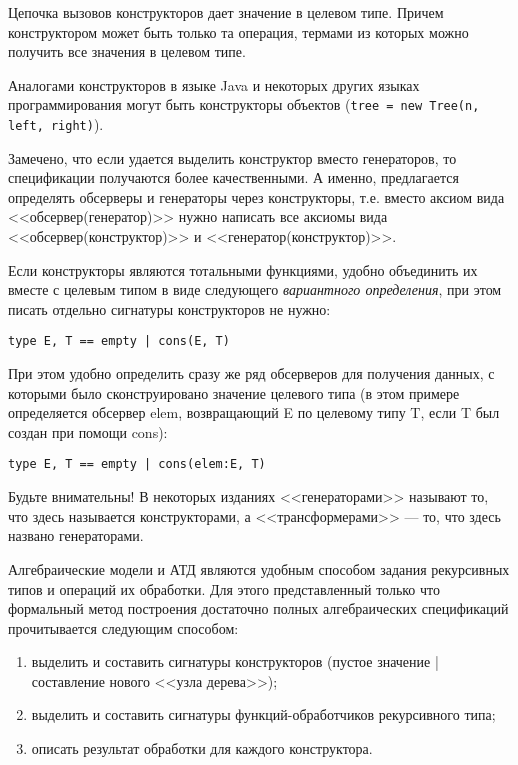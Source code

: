 Цепочка вызовов конструкторов дает значение в целевом типе. Причем конструктором может быть только та операция, термами из которых можно получить все значения в целевом типе.

Аналогами конструкторов в языке Java и некоторых других языках программирования могут быть конструкторы объектов (\texttt{tree = new Tree(n, left, right)}).

Замечено, что если удается выделить конструктор вместо генераторов, то спецификации получаются более качественными. А именно, предлагается определять обсерверы и генераторы через конструкторы, т.е. вместо аксиом вида <<обсервер(генератор)>> нужно написать все аксиомы вида <<обсервер(конструктор)>> и <<генератор(конструктор)>>.

Если конструкторы являются тотальными функциями, удобно объединить их вместе с целевым типом в виде следующего \emph{вариантного определения}, при этом писать отдельно сигнатуры конструкторов не нужно:
\begin{lstlisting}
type E, T == empty | cons(E, T)
\end{lstlisting}

При этом удобно определить сразу же ряд обсерверов для получения данных, с которыми было сконструировано значение целевого типа (в этом примере определяется обсервер elem, возвращающий E по целевому типу T, если T был создан при помощи cons):
\begin{lstlisting}
type E, T == empty | cons(elem:E, T)
\end{lstlisting}

Будьте внимательны! В некоторых изданиях <<генераторами>> называют то, что здесь называется конструкторами, а <<трансформерами>> --- то, что здесь названо генераторами.

Алгебраические модели и АТД являются удобным способом задания рекурсивных типов и операций их обработки. Для этого представленный только что формальный метод построения достаточно полных алгебраических спецификаций прочитывается следующим способом:
\begin{enumerate}
  \item выделить и составить сигнатуры конструкторов (пустое значение | составление нового <<узла дерева>>);
  \item выделить и составить сигнатуры функций-обработчиков рекурсивного типа;
  \item описать результат обработки для каждого конструктора.
\end{enumerate}

